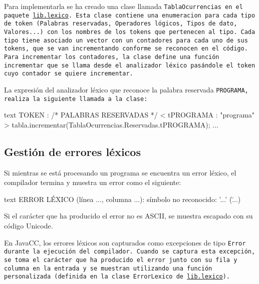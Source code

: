 \documentclass[../main.tex]{subfiles}
\begin{document}
Para implementarla se ha creado una clase llamada \tt{TablaOcurrencias} en el paquete \url{lib.lexico}. Esta clase contiene una enumeracion para cada tipo de token (Palabras reservadas, Operadores lógicos, Tipos de dato, Valores...) con los nombres de los tokens que pertenecen al tipo. Cada tipo tiene asociado un vector con un contadores para cada uno de sus tokens, que se van incrementando conforme se reconocen en el código. Para incrementar los contadores, la clase define una función \tt{incrementar} que se llama desde el analizador léxico pasándole el token cuyo contador se quiere incrementar.

La expresión del analizador léxico que reconoce la palabra reservada \tt{PROGRAMA}, realiza la siguiente llamada a la clase:


\begin{codigo}{text}
TOKEN : /* PALABRAS RESERVADAS */
{
  < tPROGRAMA : "programa" >
  {
    tabla.incrementar(TablaOcurrencias.Reservadas.tPROGRAMA);
  }
  ...
}
\end{codigo}

\subsection{Gestión de errores léxicos}
Si mientras se está procesando un programa se encuentra un error léxico, el compilador termina y muestra un error como el siguiente:

\begin{codigo}{text}
ERROR LÉXICO (línea ..., columna ...): símbolo no reconocido: '...' (\u...)
\end{codigo}

Si el carácter que ha producido el error no es ASCII, se muestra escapado con su código Unicode.

En JavaCC, los errores léxicos son capturados como excepciones de tipo \tt{Error} durante la ejecución del compilador. Cuando se captura esta excepción, se toma el carácter que ha producido el error junto con su fila y columna en la entrada y se muestran utilizando una función personalizada (definida en la clase \tt{ErrorLexico} de \url{lib.lexico}).
\end{document}
